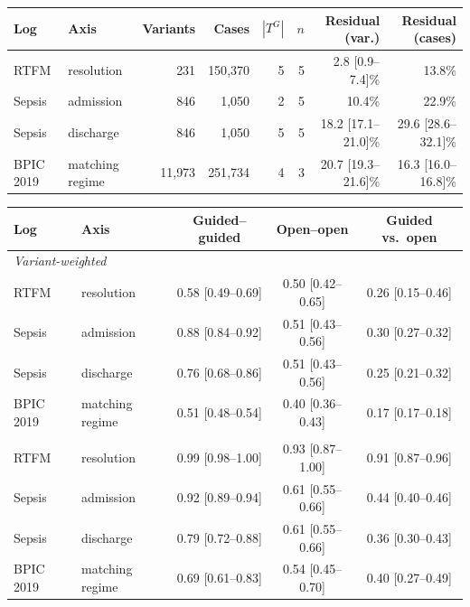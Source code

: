 \begin{tabular}{llrrrrrr}
\toprule
Log & Axis & Variants & Cases & $|T^G|$ & $n$ & Residual (var.) & Residual (cases) \\
\midrule
RTFM & resolution & 231 & 150{,}370 & 5 & 5 & 2.8 [0.9--7.4]\% & 13.8\% \\
Sepsis & admission & 846 & 1{,}050 & 2 & 5 & 10.4\% & 22.9\% \\
Sepsis & discharge & 846 & 1{,}050 & 5 & 5 & 18.2 [17.1--21.0]\% & 29.6 [28.6--32.1]\% \\
BPIC 2019 & matching regime & 11{,}973 & 251{,}734 & 4 & 3 & 20.7 [19.3--21.6]\% & 16.3 [16.0--16.8]\% \\
\bottomrule
\end{tabular}

\begin{tabular}{llccc}
\toprule
Log & Axis & Guided--guided & Open--open & Guided vs.\ open \\
\midrule
\multicolumn{5}{l}{\emph{Variant-weighted}} \\
RTFM & resolution & 0.58 [0.49--0.69] & 0.50 [0.42--0.65] & 0.26 [0.15--0.46] \\
Sepsis & admission & 0.88 [0.84--0.92] & 0.51 [0.43--0.56] & 0.30 [0.27--0.32] \\
Sepsis & discharge & 0.76 [0.68--0.86] & 0.51 [0.43--0.56] & 0.25 [0.21--0.32] \\
BPIC 2019 & matching regime & 0.51 [0.48--0.54] & 0.40 [0.36--0.43] & 0.17 [0.17--0.18] \\
\addlinespace
\multicolumn{5}{l}{\emph{Case-weighted}} \\
RTFM & resolution & 0.99 [0.98--1.00] & 0.93 [0.87--1.00] & 0.91 [0.87--0.96] \\
Sepsis & admission & 0.92 [0.89--0.94] & 0.61 [0.55--0.66] & 0.44 [0.40--0.46] \\
Sepsis & discharge & 0.79 [0.72--0.88] & 0.61 [0.55--0.66] & 0.36 [0.30--0.43] \\
BPIC 2019 & matching regime & 0.69 [0.61--0.83] & 0.54 [0.45--0.70] & 0.40 [0.27--0.49] \\
\bottomrule
\end{tabular}
